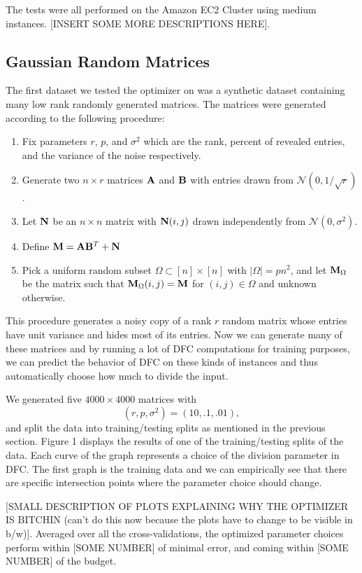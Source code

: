The tests were all performed on the Amazon EC2 Cluster using medium instances. [INSERT SOME MORE DESCRIPTIONS HERE]. 

\subsection{Gaussian Random Matrices}
The first dataset we tested the optimizer on was a synthetic dataset containing many low rank randomly generated matrices. The matrices were generated according to the following procedure: 
\begin{enumerate}
\item Fix parameters $r$, $p$, and $\sigma^2$ which are the rank, percent of revealed entries, and the variance of the noise respectively.
\item Generate two $n \times r$ matrices ${\bf A}$ and ${\bf B}$ with entries drawn from $\mathcal{N}(0,1/\sqrt{r})$. 
\item Let ${\bf N}$ be an $n \times n$ matrix with ${\bf N}(i,j)$ drawn independently from $\mathcal{N}(0,\sigma^2)$. 
\item Define ${\bf M} = {\bf A}{\bf B}^T + {\bf N}$
\item Pick a uniform random subset $\Omega \subset [n] \times [n]$ with $|\Omega| = pn^2$, and let ${\bf M}_{\Omega}$ be the matrix such that ${\bf M}_{\Omega}(i,j) = {\bf M}$ for $(i,j) \in \Omega$ and unknown otherwise. 
\end{enumerate}
This procedure generates a noisy copy of a rank $r$ random matrix whose entries have unit variance and hides most of its entries. Now we can generate many of these matrices and by running a lot of DFC computations for training purposes, we can predict the behavior of DFC on these kinds of instances and thus automatically choose how much to divide the input. 

We generated five $4000 \times 4000$ matrices with 
\[(r,p,\sigma^2) = (10,.1,.01),\] 
and split the data into training/testing splits as mentioned in the previous section. Figure 1 displays the results of one of the training/testing splits of the data. Each curve of the graph represents a choice of the division parameter in DFC. The first graph is the training data and we can empirically see that there are specific intersection points where the parameter choice should change. 

[SMALL DESCRIPTION OF PLOTS EXPLAINING WHY THE OPTIMIZER IS BITCHIN (can't do this now because the plots have to change to be visible in b/w)]. Averaged over all the cross-validations, the optimized parameter choices perform within [SOME NUMBER] of minimal error, and coming within [SOME NUMBER] of the budget.

